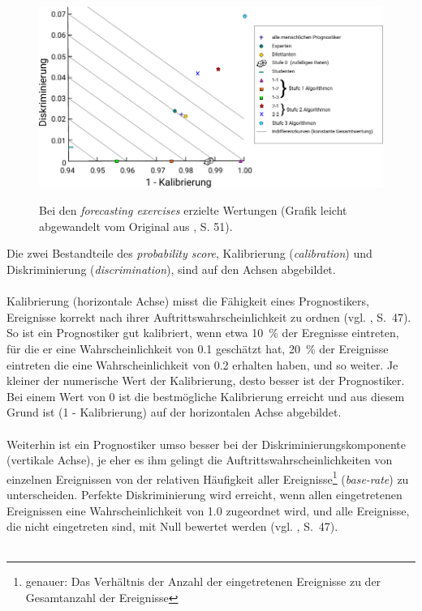 \begin{figure}%
\centering
\caption{ Bei den \emph{forecasting exercises} erzielte Wertungen 
  (Grafik leicht abgewandelt vom Original aus \cite{Tetlock}, S. 51). }
\includegraphics[scale=1.0]{Grafiken/Tetlock_1_Fertig_Ink.pdf} 
\label{pic:Tetlock_1}
\end{figure}
Die zwei
Bestandteile des \emph{probability score}, Kalibrierung (\emph{calibration}) und
Diskriminierung (\emph{discrimination}), sind auf den Achsen abgebildet. \\ \\ 
Kalibrierung (horizontale Achse) misst die Fähigkeit eines Prognostikers,
Ereignisse korrekt nach ihrer
Auftrittswahrscheinlichkeit zu ordnen (vgl. \cite{Tetlock}, S.~47). So ist ein
Prognostiker gut kalibriert, wenn etwa 10~\% der Eregnisse eintreten, für die
er eine Wahrscheinlichkeit von 0.1 geschätzt hat, 20~\% der Ereignisse eintreten
die eine Wahrscheinlichkeit von 0.2 erhalten haben, und so weiter. Je kleiner
der numerische Wert der Kalibrierung, desto besser ist der Prognostiker. Bei
einem Wert von 0 ist die bestmögliche Kalibrierung erreicht und aus diesem Grund
ist (1 - Kalibrierung) auf der horizontalen Achse abgebildet. \\ \\
Weiterhin ist ein Prognostiker umso besser bei der Diskriminierungskomponente
(vertikale Achse),
je eher es ihm gelingt die Auftrittswahrscheinlichkeiten von einzelnen
Ereignissen von der relativen Häufigkeit aller Ereignisse\footnote{
genauer: Das Verhältnis der Anzahl der eingetretenen Ereignisse zu der
Gesamtanzahl der Ereignisse} (\emph{base-rate})
zu unterscheiden. Perfekte Diskriminierung wird erreicht, wenn allen 
eingetretenen Ereignissen eine Wahrscheinlichkeit von 1.0 zugeordnet wird, und
alle Ereignisse, die nicht eingetreten sind, mit Null bewertet werden
(vgl. \cite{Tetlock}, S.~47).\\ \\
